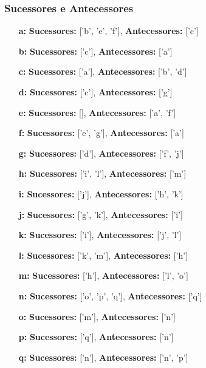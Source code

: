 \documentclass[a4paper,12pt]{article}
\begin{document}
\subsubsection*{Sucessores e Antecessores}
\begin{itemize}[leftmargin=*]
    \item[\textbf{a:}] \textbf{Sucessores:} ['b', 'e', 'f'], \textbf{Antecessores:} ['c']
    \item[\textbf{b:}] \textbf{Sucessores:} ['c'], \textbf{Antecessores:} ['a']
    \item[\textbf{c:}] \textbf{Sucessores:} ['a'], \textbf{Antecessores:} ['b', 'd']
    \item[\textbf{d:}] \textbf{Sucessores:} ['c'], \textbf{Antecessores:} ['g']
    \item[\textbf{e:}] \textbf{Sucessores:} [], \textbf{Antecessores:} ['a', 'f']
    \item[\textbf{f:}] \textbf{Sucessores:} ['e', 'g'], \textbf{Antecessores:} ['a']
    \item[\textbf{g:}] \textbf{Sucessores:} ['d'], \textbf{Antecessores:} ['f', 'j']
    \item[\textbf{h:}] \textbf{Sucessores:} ['i', 'l'], \textbf{Antecessores:} ['m']
    \item[\textbf{i:}] \textbf{Sucessores:} ['j'], \textbf{Antecessores:} ['h', 'k']
    \item[\textbf{j:}] \textbf{Sucessores:} ['g', 'k'], \textbf{Antecessores:} ['i']
    \item[\textbf{k:}] \textbf{Sucessores:} ['i'], \textbf{Antecessores:} ['j', 'l']
    \item[\textbf{l:}] \textbf{Sucessores:} ['k', 'm'], \textbf{Antecessores:} ['h']
    \item[\textbf{m:}] \textbf{Sucessores:} ['h'], \textbf{Antecessores:} ['l', 'o']
    \item[\textbf{n:}] \textbf{Sucessores:} ['o', 'p', 'q'], \textbf{Antecessores:} ['q']
    \item[\textbf{o:}] \textbf{Sucessores:} ['m'], \textbf{Antecessores:} ['n']
    \item[\textbf{p:}] \textbf{Sucessores:} ['q'], \textbf{Antecessores:} ['n']
    \item[\textbf{q:}] \textbf{Sucessores:} ['n'], \textbf{Antecessores:} ['n', 'p']
\end{itemize}
\end{document}
